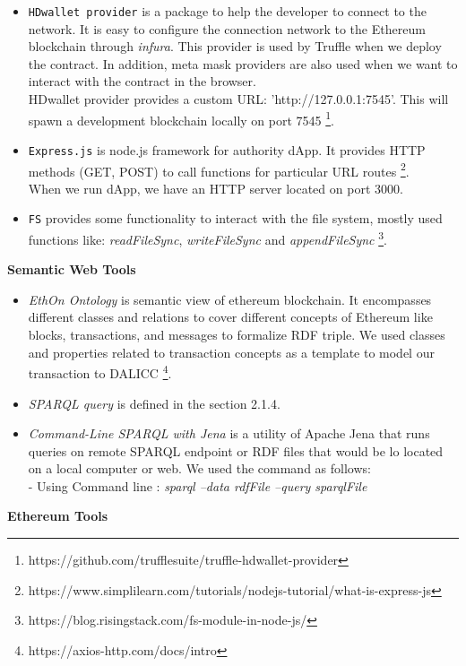 \begin{itemize}
\item \texttt{HDwallet provider} is a package to help the developer to connect to the network. It is easy to configure the connection network to the Ethereum blockchain through \textit{infura}. This provider is used by Truffle when we deploy the contract. In addition, meta mask providers are also used when we want to interact with the contract in the browser.\\
HDwallet provider provides a custom URL: 'http://127.0.0.1:7545'. This will spawn a development blockchain locally on port 7545 \footnote{https://github.com/trufflesuite/truffle-hdwallet-provider}. \\
\item \texttt{Express.js} is node.js framework for authority dApp. It provides HTTP methods (GET, POST) to call functions for particular URL routes \footnote{https://www.simplilearn.com/tutorials/nodejs-tutorial/what-is-express-js}. \\ 
When we run dApp, we have an HTTP server located on port 3000. \\
\item \texttt{FS} provides some functionality to interact with the file system, mostly used functions like: \textit{readFileSync}, \textit{writeFileSync} and \textit{appendFileSync} \footnote{https://blog.risingstack.com/fs-module-in-node-js/}. \\
\end{itemize}

\textbf{Semantic Web Tools}\\
\begin{itemize}
	\item \textit{EthOn Ontology} is semantic view of ethereum blockchain. It encompasses different classes and relations to cover different concepts of Ethereum like blocks, transactions, and messages to formalize RDF triple. We used classes and properties related to transaction concepts as a template to model our transaction to DALICC \footnote{https://axios-http.com/docs/intro}.
	\item \textit{SPARQL query} is defined in the section 2.1.4.
	\item \textit{Command-Line SPARQL with Jena} is a utility of Apache Jena that runs queries on remote SPARQL endpoint or RDF files that would be lo located on a local computer or web. We used the command as follows:\\
	 - Using Command line : \textit{sparql --data rdfFile --query sparqlFile}
	
\end{itemize}
\textbf{Ethereum Tools}

